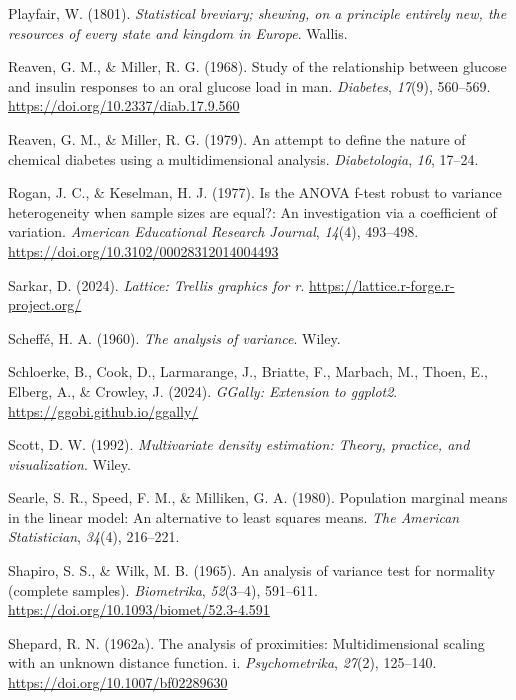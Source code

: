\documentclass[
  letterpaper,
  10pt,
  krantz2]{krantz}
\newlength{\cslhangindent}
\newenvironment{CSLReferences}[2] %
 {\begin{list}{}{%
  \setlength{\itemindent}{0pt}
  \setlength{\leftmargin}{0pt}
  \setlength{\parsep}{0pt}
  \ifodd #1
   \setlength{\leftmargin}{\cslhangindent}
   \setlength{\itemindent}{-1\cslhangindent}
  \fi
  \setlength{\itemsep}{#2\baselineskip}}}
 {\end{list}}
\begin{document}
\begin{CSLReferences}{1}{0}
Playfair, W. (1801). \emph{Statistical breviary; shewing, on a principle
entirely new, the resources of every state and kingdom in {Europe}}.
Wallis.

Reaven, G. M., \& Miller, R. G. (1968). Study of the relationship
between glucose and insulin responses to an oral glucose load in man.
\emph{Diabetes}, \emph{17}(9), 560--569.
\url{https://doi.org/10.2337/diab.17.9.560}

Reaven, G. M., \& Miller, R. G. (1979). An attempt to define the nature
of chemical diabetes using a multidimensional analysis.
\emph{Diabetologia}, \emph{16}, 17--24.

Rogan, J. C., \& Keselman, H. J. (1977). Is the {ANOVA} f-test robust to
variance heterogeneity when sample sizes are equal?: An investigation
via a coefficient of variation. \emph{American Educational Research
Journal}, \emph{14}(4), 493--498.
\url{https://doi.org/10.3102/00028312014004493}

Sarkar, D. (2024). \emph{Lattice: Trellis graphics for r}.
\url{https://lattice.r-forge.r-project.org/}

Scheffé, H. A. (1960). \emph{The analysis of variance}. Wiley.

Schloerke, B., Cook, D., Larmarange, J., Briatte, F., Marbach, M.,
Thoen, E., Elberg, A., \& Crowley, J. (2024). \emph{GGally: Extension to
ggplot2}. \url{https://ggobi.github.io/ggally/}

Scott, D. W. (1992). \emph{Multivariate density estimation: Theory,
practice, and visualization}. Wiley.

Searle, S. R., Speed, F. M., \& Milliken, G. A. (1980). Population
marginal means in the linear model: An alternative to least squares
means. \emph{The American Statistician}, \emph{34}(4), 216--221.

Shapiro, S. S., \& Wilk, M. B. (1965). An analysis of variance test for
normality (complete samples). \emph{Biometrika}, \emph{52}(3--4),
591--611. \url{https://doi.org/10.1093/biomet/52.3-4.591}

Shepard, R. N. (1962a). The analysis of proximities: Multidimensional
scaling with an unknown distance function. i. \emph{Psychometrika},
\emph{27}(2), 125--140. \url{https://doi.org/10.1007/bf02289630}


\end{CSLReferences}
\end{document}
